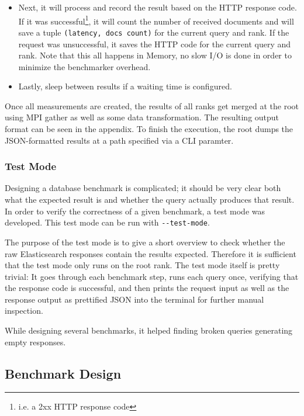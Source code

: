 \begin{itemize}
\begin{itemize}
      \item Next, it will process and record the result based on the HTTP response code. If it was successful\footnote{i.e. a 2xx HTTP response code}, it will count the number of received documents and will save a tuple \texttt{(latency, docs count)} for the current query and rank. If the request was unsuccessful, it saves the HTTP code for the current query and rank. Note that this all happens in Memory, no slow I/O is done in order to minimize the benchmarker overhead.
      \item Lastly, sleep between results if a waiting time is configured.
    \end{itemize}
\end{itemize}

Once all measurements are created, the results of all ranks get merged at the root using \ac{MPI} gather as well as some data transformation. The resulting output format can be seen in the appendix. To finish the execution, the root dumps the JSON-formatted results at a path specified via a \ac{CLI} paramter.

\subsubsection{Test Mode}
Designing a database benchmark is complicated; it should be very clear both what the expected result is and whether the query actually produces that result. In order to verify the correctness of a given benchmark, a test mode was developed. This test mode can be run with \texttt{-{}-test-mode}.

The purpose of the test mode is to give a short overview to check whether the raw Elasticsearch responses contain the results expected. Therefore it is sufficient that the test mode only runs on the root rank. The test mode itself is pretty trivial: It goes through each benchmark step, runs each query once, verifying that the response code is successful, and then prints the request input as well as the response output as prettified JSON into the terminal for further manual inspection.

While designing several benchmarks, it helped finding broken queries generating empty responses.

\subsection{Benchmark Design}
